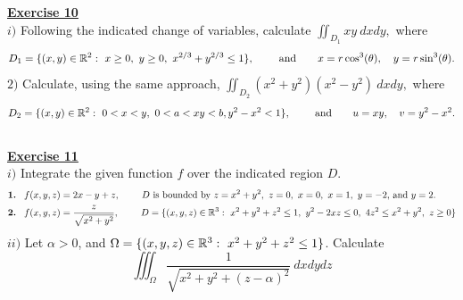 \vspace*{0.34cm}
\noindent\Large{\underline{\textbf{Exercise 10}}}
\normalsize{}\\
\noindent $i)$ Following the indicated change of variables, calculate $\displaystyle \iint_{D_1} xy\ dxdy,$ where
$$D_1 = \{(x,y)\in\R^2:\ x\geq 0,\ y\geq 0,\ x^{2/3} + y^{2/3} \leq 1\},\qquad \text{  and} \qquad
                                                       x = r\cos^3(\theta),\quad y = r\sin^3(\theta).$$
\noindent $2)$ Calculate, using the same approach, $\displaystyle \iint_{D_2} (x^2 + y^2)(x^2 - y^2)\ dxdy,$ where
$$D_2 = \{(x,y)\in\mathbb{R}^2:\ 0 < x < y,\ 0 < a < xy < b, y^2 - x^2 < 1\},\qquad \text{  and} \qquad 
                                                       u = xy,\quad v = y^2 - x^2.$$\\
\noindent\Large{\underline{\textbf{Exercise 11}}}
\normalsize{}\\
\noindent $i)$ Integrate the given function $f$ over the indicated region $D$.
\begin{align*}
    \textbf{1. }& \ f(x,y,z) = 2x - y + z, \qquad \text{ $D$ is bounded by $z = x^2 + y^2,\ z = 0,\ 
                                                                    x = 0,\ x = 1,\ y = -2$, and $y = 2$.}\\
    \textbf{2. }& \ f(x,y,z) = \dfrac{z}{\sqrt{x^2 + y^2}},\ \qquad D = \{(x,y,z)\in\R^3:\ x^2 + y^2 + z^2 \leq 1,\
                                                              y^2 - 2xz \leq 0,\ 4z^2 \leq x^2 + y^2,\ z\geq 0\}
\end{align*}
\noindent $ii)$ Let $\alpha > 0$, and $\Omega = \{(x,y,z)\in\mathbb{R}^3:\ x^2 + y^2 + z^2 \leq 1\}$. Calculate
$$\displaystyle \iiint_\Omega \frac{1}{\sqrt{x^2 + y^2 + (z - \alpha)^2}}\ dxdydz$$
